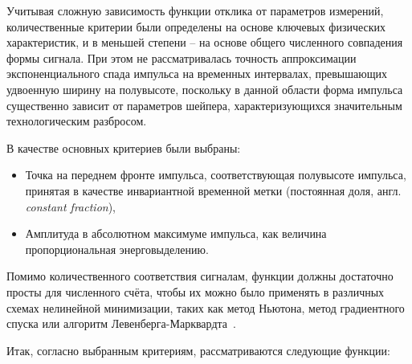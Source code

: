 Учитывая сложную зависимость функции отклика
от параметров измерений, количественные критерии были
определены на основе ключевых физических
характеристик, и в меньшей степени -- на основе общего численного
совпадения формы сигнала.
При этом не рассматривалась точность аппроксимации экспоненциального
спада импульса на временных интервалах, превышающих удвоенную ширину
на полувысоте, поскольку в данной области форма импульса существенно
зависит от параметров шейпера, характеризующихся значительным
технологическим разбросом.

В качестве основных критериев были выбраны:
\begin{itemize}
    \item Точка на переднем фронте импульса, соответствующая полувысоте
    импульса, принятая в качестве инвариантной временной метки (постоянная
    доля, англ. \emph{constant fraction}),
    \item Амплитуда в абсолютном максимуме импульса, как величина
    пропорциональная энерговыделению.
\end{itemize}

Помимо количественного соответствия сигналам, функции должны достаточно
просты для численного счёта, чтобы их можно было применять в различных
схемах нелинейной минимизации, таких как метод Ньютона, метод градиентного спуска
или алгоритм Левенберга-Марквардта~\cite{marquardt-lms}.

Итак, согласно выбранным критериям, рассматриваются следующие функции:

